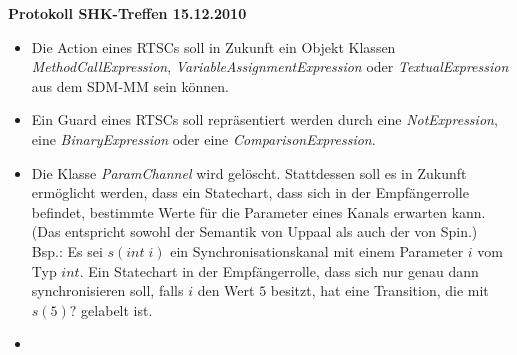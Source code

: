 \documentclass[11pt,a4paper]{article}
\begin{document}
\begin{center}

\textbf{\huge Protokoll SHK-Treffen 15.12.2010}\\[0.9cm]

\end{center}

\begin{itemize}
  \item Die Action eines RTSCs soll in Zukunft ein Objekt Klassen
  \emph{MethodCallExpression}, \emph{VariableAssignmentExpression} oder
  \emph{TextualExpression} aus dem SDM-MM sein können.
  \item Ein Guard eines RTSCs soll repräsentiert werden durch eine
  \emph{NotExpression}, eine \emph{BinaryExpression} oder eine
  \emph{ComparisonExpression}.
  \item Die Klasse \emph{ParamChannel} wird gelöscht. Stattdessen soll es in
  Zukunft ermöglicht werden, dass ein Statechart, dass sich in der
  Empfängerrolle befindet, bestimmte Werte für die Parameter eines Kanals
  erwarten kann. (Das entspricht sowohl der Semantik von Uppaal als auch der von
  Spin.) Bsp.: Es sei $s(int\;i)$ ein Synchronisationskanal mit einem Parameter
  $i$ vom Typ $int$. Ein Statechart in der Empfängerrolle, dass sich nur genau
  dann synchronisieren soll, falls $i$ den Wert $5$ besitzt, hat eine
  Transition, die mit $s(5)?$ gelabelt ist.
  \item 
\end{itemize}
\end{document}
